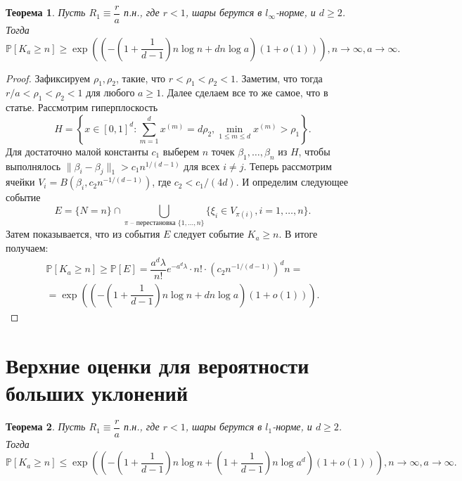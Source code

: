 \documentclass[12pt]{article}
\theoremstyle{plain}
\newtheorem{thm}{Теорема} %
\theoremstyle{definition}
\theoremstyle{remark}
\def\geq{\geqslant}
\def\leq{\leqslant}
\newcommand{\slim}{\sum\limits}
\newcommand{\PP}{\mathbb{P}}
\begin{document}
\begin{thm}
Пусть $R_1\equiv \dfrac{r}{a}$ п.н., где $r<1$, шары берутся в $l_\infty$-норме, и $d\geq 2$. Тогда $$\PP[K_a \geq n] \geq \exp \left(\left(-\left(1+\dfrac{1}{d-1}\right)n\log n + dn\log a \right)(1 + o(1))\right), n \to \infty, a\to \infty.$$
\end{thm}{}

\begin{proof} 
Зафиксируем $\rho_1, \rho_2$, такие, что $r<\rho_1<\rho_2<1$. Заметим, что тогда $r/a<\rho_1<\rho_2<1$ для любого $a\geq 1$. Далее сделаем все то же самое, что в статье. Рассмотрим гиперплоскость $$H = \left\{x\in[0, 1]^d \colon \slim_{m=1}^dx^{(m)} = d\rho_2, \min\limits_{1\leq m \leq d}x^{(m)}>\rho_1\right\}.$$ 
Для достаточно малой константы $c_1$ выберем $n$ точек $\beta_1, \ldots, \beta_n$ из $H$, чтобы выполнялось $\|\beta_i - \beta_j\|_1 > c_1n^{1/(d-1)}$ для всех $i\not= j$. Теперь рассмотрим ячейки $V_i = B(\beta_i, c_2n^{-1/(d-1)})$, где $c_2 < c_1/(4d)$. И определим следующее событие $$E = \{N = n\} \cap  \bigcup\limits_{\pi \text{ -- перестановка } \{1, \ldots, n\}} \{\xi_i \in V_{\pi(i)}, i = 1, \ldots, n\}.$$
Затем показывается, что из события $E$ следует событие $K_a \geq n$. В итоге получаем:
\begin{multline*}
    \PP[K_a \geq n] \geq \PP[E] = \dfrac{a^d\lambda}{n!}e^{-a^d\lambda}\cdot n!\cdot \left(c_2n^{-1/(d-1)}\right)^dn = \\
    =\exp \left(\left(-\left(1+\dfrac{1}{d-1}\right)n\log n + dn\log a\right)(1+o(1))\right).
\end{multline*}{}
\end{proof}{}

\section{Верхние оценки для вероятности больших уклонений}

\begin{thm}
Пусть $R_1\equiv \dfrac{r}{a}$ п.н., где $r<1$, шары берутся в $l_1$-норме, и $d\geq 2$. 
Тогда $$\PP[K_a \geq n] \leq \exp \left(\left(-\left(1+\dfrac{1}{d-1}\right)n\log n + \left(1 + \dfrac{1}{d-1}\right)n\log a^d \right)(1 + o(1))\right), n \to \infty, a\to \infty.$$
\end{thm}{}
\end{document}
